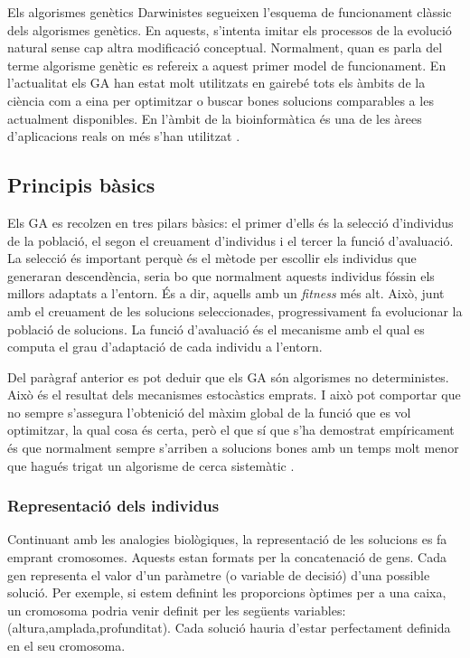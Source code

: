 Els algorismes genètics Darwinistes segueixen l'esquema de funcionament clàssic
dels algorismes genètics. En aquests, s'intenta imitar els processos de la
evolució natural sense cap altra modificació conceptual. Normalment, quan es
parla del terme algorisme genètic es refereix a aquest primer model de
funcionament. En l'actualitat els GA han estat molt utilitzats en gairebé tots
els àmbits de la ciència com a eina per optimitzar o buscar bones solucions
comparables a les actualment disponibles. En l'àmbit de la bioinformàtica és una
de les àrees d'aplicacions reals on més s'han utilitzat
\cite{PSBE01,D96,wgl:2000,WWBG95}.

\subsection{Principis bàsics}

Els GA es recolzen en tres pilars bàsics: el primer d'ells és la selecció
d'individus de la població, el segon el creuament d'individus i el tercer la
funció d'avaluació. La selecció és important perquè és el mètode per escollir
els individus que generaran descendència, seria bo que normalment aquests
individus fóssin els millors adaptats a l'entorn. És a dir, aquells amb un
\emph{fitness} més alt.  Això, junt amb el creuament de les solucions
seleccionades, progressivament fa evolucionar la població de solucions. La
funció d'avaluació és el mecanisme amb el qual es computa el grau d'adaptació de
cada individu a l'entorn.

Del paràgraf anterior es pot deduir que els GA són algorismes no deterministes.
Això és el resultat dels mecanismes estocàstics emprats. I això pot comportar
que no sempre s'assegura l'obtenició del màxim global de la funció que es vol
optimitzar, la qual cosa és certa, però el que sí que s'ha demostrat
empíricament és que normalment sempre s'arriben a solucions bones amb un temps
molt menor que hagués trigat un algorisme de cerca sistemàtic \cite{BBM93}. 

\subsubsection{Representació dels individus}

Continuant amb les analogies biològiques, la representació de les solucions es
fa emprant cromosomes. Aquests estan formats per la concatenació de gens. Cada
gen representa el valor d'un paràmetre (o variable de decisió) d'una possible
solució.  Per exemple, si estem definint les proporcions òptimes per a una
caixa, un cromosoma podria venir definit per les següents variables:
(altura,amplada,profunditat). Cada solució hauria d'estar perfectament definida
en el seu cromosoma.

